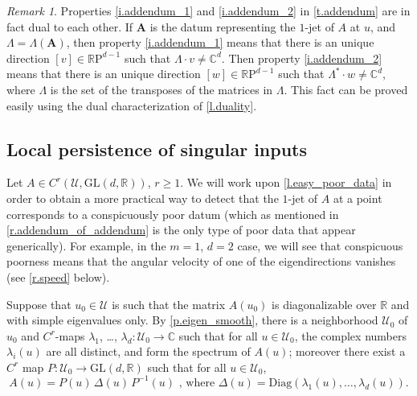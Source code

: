 \documentclass[10pt, a4paper]{amsart}
\theoremstyle{plain}
\theoremstyle{definition}
\theoremstyle{remark}
\theoremstyle{note}
\newtheorem{rem}[lemma]{Remark}
\numberwithin{equation}{section}
\begin{document}
\begin{rem}
Properties \ref{i.addendum_1} and \ref{i.addendum_2} in \cref{t.addendum}
are in fact dual to each other.
If ${\mathbf{A}}$ is the datum representing the $1$-jet of $A$ at $u$,
and $\Lambda = \Lambda({\mathbf{A}})$,
then property \ref{i.addendum_1} means that there is an unique direction 
$[v] \in {\mathbb{R}\mathrm{P}}^{d-1}$ such that $\Lambda \cdot v \neq {\mathbb{C}}^d$.
Then property \ref{i.addendum_2} means that there is an unique direction 
$[w] \in {\mathbb{R}\mathrm{P}}^{d-1}$ such that $\Lambda^* \cdot w \neq {\mathbb{C}}^d$,
where $\Lambda$ is the set of the transposes of the matrices in $\Lambda$.
This fact can be proved easily using the dual characterization of \cref{l.duality}. 
\end{rem}

\subsection{Local persistence of singular inputs}

Let $A \in C^r( {\mathcal{U}}, {\mathrm{GL}}(d,{\mathbb{R}}))$, $r \ge 1$.
We will work upon \cref{l.easy_poor_data} in order to 
obtain a more practical way to detect that the $1$-jet of $A$ at a point
corresponds to a conspicuously poor datum
(which as mentioned in \cref{r.addendum_of_addendum} is the only type of poor data that appear generically).
For example, in the $m=1$, $d=2$ case, we will see that conspicuous poorness means that
the angular velocity of one of the eigendirections vanishes (see \cref{r.speed} below).

\medskip

Suppose that $u_0 \in {\mathcal{U}}$ is such that the matrix $A(u_0)$ is diagonalizable over ${\mathbb{R}}$ 
and with simple eigenvalues only.
By \cref{p.eigen_smooth}, there is a neighborhood ${\mathcal{U}}_0$ of $u_0$
 and $C^r$-maps $\lambda_1$, \dots, $\lambda_d\colon {\mathcal{U}}_0\to {\mathbb{C}}$ such that for all $u\in {\mathcal{U}}_0$, the complex numbers $\lambda_i(u)$ are all distinct, and form the spectrum of $A(u)$; moreover there exist
a $C^r$ map $P \colon {\mathcal{U}}_0 \to {\mathrm{GL}}(d,{\mathbb{R}})$ 
such that for all $u \in {\mathcal{U}}_0$,
\begin{equation}\label{e.diagonalize}
A(u) = P(u) \, \Delta(u) \, P^{-1}(u) \text{ , where }
\Delta(u) = {\mathrm{Diag}} (\lambda_1(u), \dots, \lambda_d(u)).
\end{equation}
\end{document}
